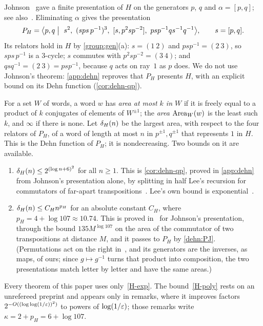 Johnson~\cite{Joh99} gave a finite presentation of $H$ on the generators $p$, $q$ and $\alpha=[p,q]$; see also~\cite[Theorem~2.8]{Lee12}.
Eliminating $\alpha$ gives the presentation
\begin{equation}\label{eq:PH}
P_H=\bigl\langle p,q\bigm|\ s^2,\ (sps\,p^{-1})^3,\ [s,p^2sp^{-2}],\ psp^{-1}qs^{-1}q^{-1}\bigr\rangle,\qquad s=[p,q].
\end{equation}
Its relators hold in $H$ by \cref{group:gen}(a): $s=(1\ 2)$ and $psp^{-1}=(2\ 3)$, so $sps\,p^{-1}$ is a $3$-cycle; $s$ commutes with
$p^2sp^{-2}=(3\ 4)$; and $qsq^{-1}=(2\ 3)=psp^{-1}$, because $q$ acts on ray~$1$ as $p$ does. We do not use Johnson's theorem:
\cref{app:dehn} reproves that $P_H$ presents $H$, with an explicit bound on its Dehn function (\cref{cor:dehn-qp}).

For a set $W$ of words, a word $w$ has \emph{area at most $k$ in $W$} if it is freely equal to a product of $k$ conjugates of elements of
$W^{\pm1}$; the \emph{area} $\operatorname{Area}_W(w)$ is the least such $k$, and $\infty$ if there is none. Let $\delta_{H}(n)$ be the largest area, with
respect to the four relators of $P_H$, of a word of length at most $n$ in $p^{\pm1},q^{\pm1}$ that represents $1$ in $H$. This is the
Dehn function of $P_H$; it is nondecreasing. Two bounds on it are available.
\begin{enumerate}[label=(H\arabic*),leftmargin=3.2em]
\item\label{H-exp} $\delta_{H}(n)\le2^{(\log n+6)^2}$ for all $n\ge1$. This is \cref{cor:dehn-qp}, proved in \cref{app:dehn} from Johnson's
presentation alone, by splitting in half Lee's recursion for commutators of far-apart transpositions~\cite[Section~4.2]{Lee12}. Lee's own
bound is exponential~\cite[Theorem~D]{Lee12}.
\item\label{H-poly} $\delta_{H}(n)\le C_Hn^{p_H}$ for an absolute constant $C_H$, where $p_H=4+\log107\approx10.74$. This is proved
in~\cite[Theorems~3.2 and~3.3]{DM-H3} for Johnson's presentation, through the bound $135M^{\log107}$ on the area of the commutator of two
transpositions at distance $M$, and it passes to $P_H$ by \cref{dehn:PJ}. (Permutations act on the right in~\cite{DM-H3}, and its
generators are the inverses, as maps, of ours; since $g\mapsto g^{-1}$ turns that product into composition, the two presentations match
letter by letter and have the same areas.)
\end{enumerate}
Every theorem of this paper uses only~\ref{H-exp}. The bound~\ref{H-poly} rests on an unrefereed preprint and appears only in remarks,
where it improves factors $2^{-O((\log\log(1/\varepsilon))^2)}$ to powers of $\log(1/\varepsilon)$; those remarks write $\kappa=2+p_H=6+\log107$.

